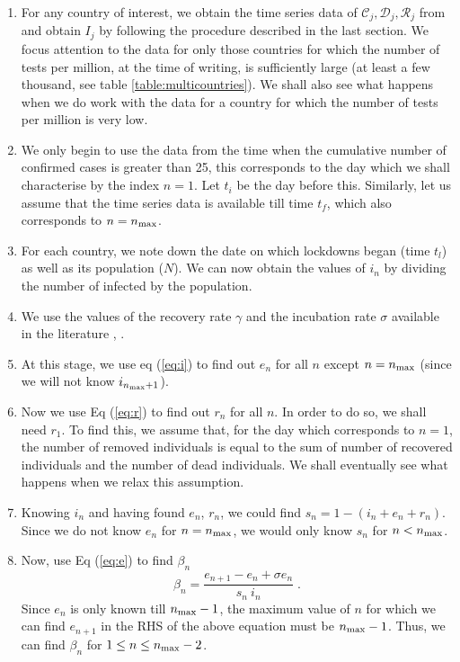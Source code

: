 \documentclass[aps,prd,10pt,twocolumn,nofootinbib]{revtex4-2}
\begin{document}
\begin{enumerate}
 \item For any country of interest, we obtain the time series data of $\mathscr{C}_j, \mathscr{D}_j, \mathscr{R}_j$ from \cite{data_ref} and obtain $I_j$ by following the procedure described in the last section.
 We focus attention to the data for only those countries for which the number of tests per million, at the time of writing, is sufficiently large (at least a few thousand, see table \ref{table:multicountries}).
We shall also see what happens when we do work with the data for a country for which the number of tests per million is very low. 
 \item We only begin to use the data from the time when the cumulative number of confirmed cases is greater than 25, this corresponds to the day which we shall characterise by the index $n=1$. Let $t_i$ be the day before this. Similarly, let us assume that the time series data is available till time $t_f$, which also corresponds to $n = n_{\rm max}$.
 \item For each country, we note down the date on which lockdowns began (time $t_l$) as well as its population ($N$).
We can now obtain the values of $i_n$ by dividing the number of infected by the population.
 \item We use the values of the recovery rate $\gamma$ and the incubation rate $\sigma$ available in the literature \cite{params}, \cite{jcm9040967}.
 \item At this stage, we use eq (\ref{eq:i}) to find out $e_n$ for all $n$ except $n = n_{\rm max}$ (since we will not know $i_{n_{\rm max}+1}$).
 \item Now we use Eq (\ref{eq:r}) to find out $r_n$ for all $n$. In order to do so, we shall need $r_1$. To find this, we assume that, for the day which corresponds to  $n=1$, the number of removed individuals is equal to the sum of number of  recovered individuals and the number of dead individuals. We shall eventually see what happens when we relax this assumption.   
 \item Knowing $i_n$ and having found $e_n$, $r_n$, we could find $s_n = 1 - (i_n + e_n + r_n)$. Since we do not know $e_n$ for $n = n_{\rm max}$, we would only know $s_n$ for $n < n_{\rm max}$.
 \item Now, use Eq (\ref{eq:e}) to find $\beta_n$
 \begin{equation} \label{eq:beta}
  \beta_n = \frac{e_{n+1} - e_n + \sigma e_n}{s_n ~ i_n} \; .
 \end{equation}
Since $e_n$ is only known till $n_{\rm max} - 1$, the maximum value of $n$ for which we can find $e_{n+1}$ in the RHS of the above equation must be $n_{\rm max} - 1$. Thus, we can find $\beta_n$ for $1\le n \le n_{\rm max} - 2$. 
\end{enumerate}
\end{document}
